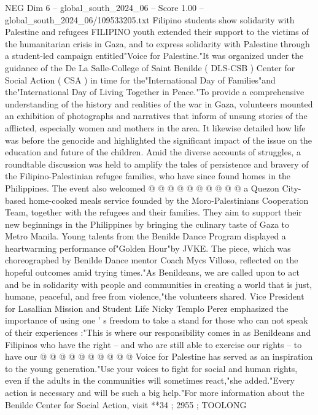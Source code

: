 \begin{textsample}{NEG Dim 6 – global\_south\_2024\_06 – Score 1.00 – global\_south\_2024\_06/109533205.txt}  \label{ex:f6_neg_306}
Filipino students show solidarity with Palestine and refugees FILIPINO youth extended their support to the victims of the humanitarian crisis in Gaza, and to express solidarity with Palestine through a student-led campaign entitled"Voice for Palestine."It was organized under the guidance of the De La Salle-College of Saint Benilde ( DLS-CSB ) Center for Social Action ( CSA ) in time for the"International Day of Families"and the"International Day of Living Together in Peace."To provide a comprehensive understanding of the history and realities of the war in Gaza, volunteers mounted an exhibition of photographs and narratives that inform of unsung stories of the afflicted, especially women and mothers in the area.
It likewise detailed how life was before the genocide and highlighted the significant impact of the issue on the education and future of the children.
Amid the diverse accounts of struggles, a roundtable discussion was held to amplify the tales of persistence and bravery of the Filipino-Palestinian refugee families, who have since found homes in the Philippines.
The event also welcomed @ @ @ @ @ @ @ @ @ @ a Quezon City-based home-cooked meals service founded by the Moro-Palestinians Cooperation Team, together with the refugees and their families.
They aim to support their new beginnings in the Philippines by bringing the culinary taste of Gaza to Metro Manila.
Young talents from the Benilde Dance Program displayed a heartwarming performance of"Golden Hour"by JVKE.
The piece, which was choreographed by Benilde Dance mentor Coach Mycs Villoso, reflected on the hopeful outcomes amid trying times."As Benildeans, we are called upon to act and be in solidarity with people and communities in creating a world that is just, humane, peaceful, and free from violence,"the volunteers shared.
Vice President for Lasallian Mission and Student Life Nicky Templo Perez emphasized the importance of using one ' s freedom to take a stand for those who can not speak of their experiences :"This is where our responsibility comes in as Benildeans and Filipinos who have the right -- and who are still able to exercise our rights -- to have our @ @ @ @ @ @ @ @ @ @ Voice for Palestine has served as an inspiration to the young generation."Use your voices to fight for social and human rights, even if the adults in the communities will sometimes react,"she added."Every action is necessary and will be such a big help."For more information about the Benilde Center for Social Action, visit **34 ; 2955 ; TOOLONG

\end{textsample}
